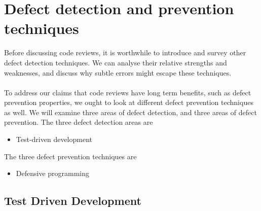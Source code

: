\chapter{Defect detection and prevention techniques} \label{chap:otherdets}

Before discussing code reviews, it is worthwhile to introduce and survey other defect
detection techniques.
We can analyse their relative strengths and weaknesses, and discuss why subtle
errors might escape these techniques.\\
\\
To address our claims that code reviews have long term benefits, such as defect
prevention properties, we ought to look at different defect prevention
techniques as well.
We will examine three areas of defect detection, and three areas of defect
prevention.
The three defect detection areas are
\begin{itemize}
  \item Test-driven development
\end{itemize}
The three defect prevention techniques are
\begin{itemize}
  \item Defensive programming
\end{itemize}

\section{Test Driven Development} \label{sec:otherdets:testDD}

